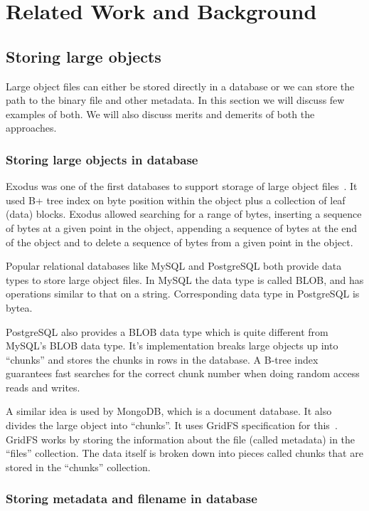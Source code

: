 \chapter{Related Work and Background}
\label{chap:relatedwork}

\section{Storing large objects}

Large object files can either be stored directly in a database or we can store the path to the binary file and other metadata. In this section we will discuss few examples of both. We will also discuss merits and demerits of both the approaches.

\subsection{Storing large objects in database}

Exodus was one of the first databases to support storage of large object files~\cite{carey1986object}. It used B+ tree index on byte position within the object plus a collection of leaf (data) blocks. Exodus allowed searching for a range of bytes, inserting a sequence of bytes at a given point in the object, appending a sequence of bytes at the end of the object and to delete a sequence of bytes from a given point in the object.

Popular relational databases like MySQL and PostgreSQL both provide data types to store large object files. In MySQL the data type is called BLOB, and has operations similar to that on a string. Corresponding data type in PostgreSQL is bytea.

PostgreSQL also provides a BLOB data type which is quite different from MySQL's BLOB data type. It's implementation breaks large objects up into ``chunks'' and stores the chunks in rows in the database. A B-tree index guarantees fast searches for the correct chunk number when doing random access reads and writes.

A similar idea is used by MongoDB, which is a document database. It also divides the large object into ``chunks''. It uses GridFS specification for this~\cite{hows2014gridfs}. GridFS works by storing the information about the file (called metadata) in the ``files'' collection. The data itself is broken down into pieces called chunks that are stored in the ``chunks'' collection.

\subsection{Storing metadata and filename in database}


